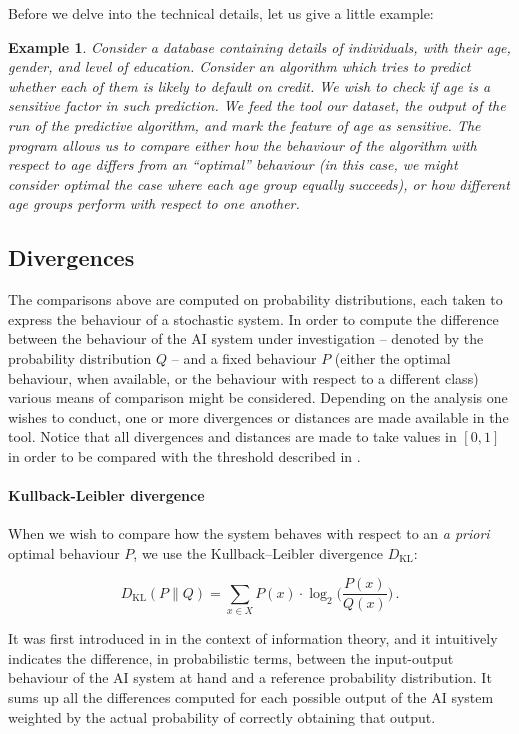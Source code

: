 \documentclass[
]{ceurart}
\newtheorem{example}{Example}
\begin{document}
Before we delve into the technical details, let us give a little example: 

\begin{example}
Consider a database containing details of individuals, with their age, gender, and level of education. Consider an algorithm which tries to predict whether each of them is likely to default on credit. We wish to check if age is a sensitive factor in such prediction. We feed the tool our dataset, the output of the run of the predictive algorithm, and mark the feature of age as sensitive. The program allows us to compare either how the behaviour of the algorithm with respect to age differs from an ``optimal'' behaviour (in this case, we might consider optimal the case where each age group equally succeeds), or how different age groups perform with respect to one another.
\end{example}
 
\subsection{Divergences}
The comparisons above are computed on probability distributions, each taken to express the behaviour of a stochastic system. In order to compute the difference between the behaviour of the AI system under investigation -- denoted by the probability distribution $Q$ -- and a fixed behaviour $P$ (either the optimal behaviour, when available, or the behaviour with respect to a different class) various means of comparison might be considered. Depending on the analysis one wishes to conduct, one or more divergences or distances are made available in the tool. Notice that all divergences and distances are made to take values in $[0,1]$ in order to be compared with the threshold described in .


\paragraph{Kullback-Leibler divergence}
When we wish to compare how the system behaves with respect to an \textit{a priori} optimal behaviour $P$, we use the Kullback–Leibler divergence $D_{\mathrm{KL}}$:

\[D_{\mathrm{KL}}(P\parallel Q)= \sum _{x\in X} P(x)\cdot \log_2 \Big( \frac{P(x)}{Q(x)}\Big)\,.\]

It was first introduced in \cite{dkl} in the context of information theory, and it intuitively indicates the difference, in probabilistic terms, between the input-output behaviour of the AI system at hand and a reference probability distribution. It sums up all the differences computed for each possible output of the AI system weighted by the actual probability of correctly obtaining that output.
\end{document}
